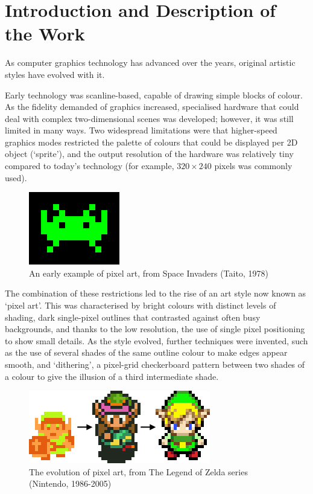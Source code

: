 \documentclass[12pt]{article}
\begin{document}
\section*{Introduction and Description of the Work}

As computer graphics technology has advanced over the years, original artistic styles have evolved with it.

Early technology was scanline-based, capable of drawing simple blocks of colour. As the fidelity demanded of graphics increased, specialised hardware that could deal with complex two-dimensional scenes was developed; however, it was still limited in many ways. Two widespread limitations were that higher-speed graphics modes restricted the palette of colours that could be displayed per 2D object (`sprite'), and the output resolution of the hardware was relatively tiny compared to today's technology (for example, $320\times240$ pixels was commonly used).

\begin{figure}[h!]
\centering
\includegraphics{spaceinvadersprite}
\caption{An early example of pixel art, from Space Invaders (Taito, 1978)}
\end{figure}

The combination of these restrictions led to the rise of an art style now known as `pixel art'. This was characterised by bright colours with distinct levels of shading, dark single-pixel outlines that contrasted against often busy backgrounds, and thanks to the low resolution, the use of single pixel positioning to show small details. As the style evolved, further techniques were invented, such as the use of several shades of the same outline colour to make edges appear smooth, and `dithering', a pixel-grid checkerboard pattern between two shades of a colour to give the illusion of a third intermediate shade.

\begin{figure}[h!]
\centering
\includegraphics{linksprite}
\caption{The evolution of pixel art, from The Legend of Zelda series (Nintendo, 1986-2005)}
\end{figure}
\end{document}
